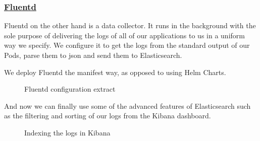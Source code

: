 \subsubsection*{\underline{Fluentd}}
Fluentd on the other hand is a data collector.
It runs in the background with the sole purpose of delivering the logs of all of our applications to us in a uniform way we specify.
We configure it to get the logs from the standard output of our Pods, parse them to json and send them to Elasticsearch.

We deploy Fluentd the manifest way, as opposed to using Helm Charts.
\begin{figure}[H]
    \centering
    \caption{Fluentd configuration extract}
    \label{fig:fluentd-config-snippet}
\end{figure}

And now we can finally use some of the advanced features of Elasticsearch such as the filtering and sorting of our logs from the Kibana dashboard.

\begin{figure}[H]
    \centering
    \caption{Indexing the logs in Kibana}
    \label{fig:kibana-logs-indexing}
\end{figure}

